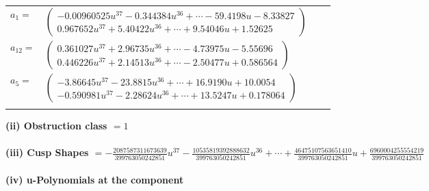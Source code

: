 \documentclass[1p]{elsarticle_modified}
\theoremstyle{definition}
\begin{document}
\begin{tabular}{m{7pt} m{180pt} m{7pt} m{180pt} }
\flushright $a_{1}=$&$\begin{pmatrix}-0.00960525 u^{37}-0.344384 u^{36}+\cdots-59.4198 u-8.33827\\0.967652 u^{37}+5.40422 u^{36}+\cdots+9.54046 u+1.52625\end{pmatrix}$ \\
\flushright $a_{12}=$&$\begin{pmatrix}0.361027 u^{37}+2.96735 u^{36}+\cdots-4.73975 u-5.55696\\0.446226 u^{37}+2.14513 u^{36}+\cdots-2.50477 u+0.586564\end{pmatrix}$ \\
\flushright $a_{5}=$&$\begin{pmatrix}-3.86645 u^{37}-23.8815 u^{36}+\cdots+16.9190 u+10.0054\\-0.590981 u^{37}-2.28624 u^{36}+\cdots+13.5247 u+0.178064\end{pmatrix}$\\&\end{tabular}
\flushleft \textbf{(ii) Obstruction class $= 1$}\\~\\
\flushleft \textbf{(iii) Cusp Shapes $= -\frac{2087587311673639}{399763050242851} u^{37}-\frac{10535819392888632}{399763050242851} u^{36}+\cdots+\frac{46475107563651410}{399763050242851} u+\frac{6960004255554219}{399763050242851}$}\\~\\
\newpage\renewcommand{\arraystretch}{1}
\flushleft \textbf{(iv) u-Polynomials at the component}\newline \\
\end{document}

